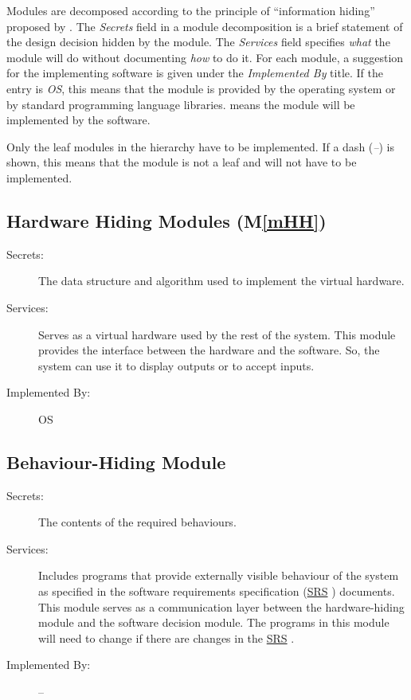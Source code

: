 \documentclass[12pt, titlepage]{article}
\newcommand{\mref}[1]{M\ref{#1}}
\begin{document}
Modules are decomposed according to the principle of ``information hiding''
proposed by \citet{ParnasEtAl1984}. The \emph{Secrets} field in a module
decomposition is a brief statement of the design decision hidden by the
module. The \emph{Services} field specifies \emph{what} the module will do
without documenting \emph{how} to do it. For each module, a suggestion for the
implementing software is given under the \emph{Implemented By} title. If the
entry is \emph{OS}, this means that the module is provided by the operating
system or by standard programming language libraries.  \emph{\progname{}} means the
module will be implemented by the \progname{} software.

Only the leaf modules in the hierarchy have to be implemented. If a dash
(\emph{--}) is shown, this means that the module is not a leaf and will not have
to be implemented.

\subsection{Hardware Hiding Modules (\mref{mHH})}

\begin{description}
\item[Secrets:]The data structure and algorithm used to implement the virtual
  hardware.
\item[Services:]Serves as a virtual hardware used by the rest of the
  system. This module provides the interface between the hardware and the
  software. So, the system can use it to display outputs or to accept inputs.
\item[Implemented By:] OS
\end{description}

\subsection{Behaviour-Hiding Module}

\begin{description}
\item[Secrets:]The contents of the required behaviours.
\item[Services:]Includes programs that provide externally visible behaviour of
  the system as specified in the software requirements specification (\href{https://github.com/paezha/PyERT-BLACK/blob/main/docs/SRS/SRS.pdf}{SRS} \citep{SRS})
  documents. This module serves as a communication layer between the
  hardware-hiding module and the software decision module. The programs in this
  module will need to change if there are changes in the \href{https://github.com/paezha/PyERT-BLACK/blob/main/docs/SRS/SRS.pdf}{SRS} \citep{SRS}.
\item[Implemented By:] --
\end{description}
\end{document}
